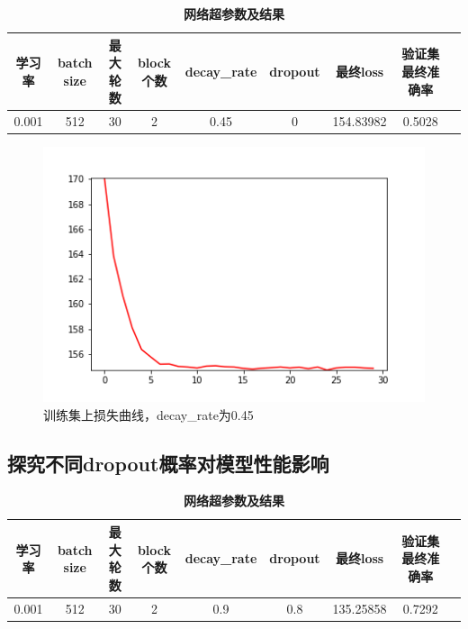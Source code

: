 \documentclass{article}
\begin{document}
	
	\begin{table}[!ht]
		\caption{\textbf{网络超参数及结果}}%
		\centering%
		\begin{tabular}{ccccccccc}
			\hline
			学习率    & batch size & 最大轮数 & block个数 & decay\_rate & dropout & 最终loss & 验证集最终准确率\\ \hline
			0.001 & 512    & 30  &  2  & 0.45 &0 & 154.83982  & 0.5028   \\ \hline
		\end{tabular}
	\end{table}
	\clearpage
	\begin{figure}[!ht]
	\centering %
	\includegraphics[scale=0.5]{runing-loss-5.png}
	\caption{训练集上损失曲线，decay\_rate为0.45}
\end{figure}

\subsection{探究不同dropout概率对模型性能影响}
\begin{table}[!ht]
	\caption{\textbf{网络超参数及结果}}%
	\centering%
	\begin{tabular}{ccccccccc}
		\hline
		学习率    & batch size & 最大轮数 & block个数 & decay\_rate & dropout & 最终loss & 验证集最终准确率\\ \hline
		0.001 & 512    & 30  &  2  & 0.9 &0.8 & 135.25858  & 0.7292  \\ \hline
	\end{tabular}
\end{table}
\end{document}
